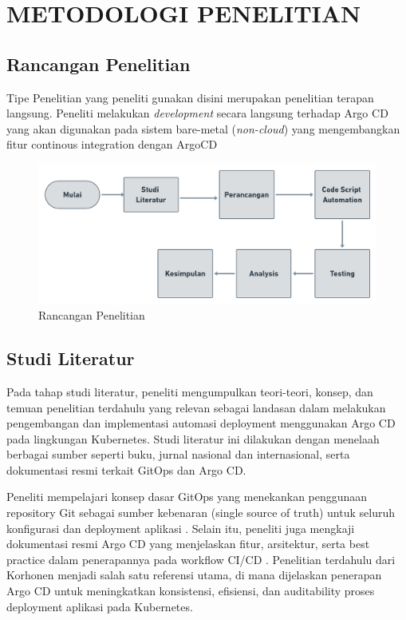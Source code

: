 \renewcommand{\chaptername}{BAB}
\chapter{METODOLOGI PENELITIAN}
\vspace{4.5pt}
\setlength{\parskip}{0.5em}
\section{Rancangan Penelitian}\label{sec:rancangan_penelitian}
Tipe Penelitian yang peneliti gunakan disini merupakan penelitian terapan langsung. Peneliti melakukan
\textit{development} secara langsung terhadap Argo CD yang akan digunakan pada sistem bare-metal (\textit{non-cloud}) yang mengembangkan fitur continous integration dengan ArgoCD

\begin{figure}[h]
    \centering
    \includegraphics[width=1\textwidth]{figures/Tahapan Skripsi.png}
    \caption{Rancangan Penelitian}
\end{figure}

\section{Studi Literatur}\label{sec:studi_literatur}
Pada tahap studi literatur, peneliti mengumpulkan teori-teori,
konsep, dan temuan penelitian terdahulu yang relevan sebagai landasan dalam melakukan pengembangan dan implementasi automasi deployment menggunakan Argo CD pada lingkungan Kubernetes.
Studi literatur ini dilakukan dengan menelaah berbagai sumber seperti buku, jurnal nasional dan internasional, serta dokumentasi resmi terkait GitOps dan Argo CD.

Peneliti mempelajari konsep dasar GitOps yang menekankan penggunaan repository Git sebagai sumber kebenaran (single source of truth) untuk seluruh konfigurasi dan deployment aplikasi \cite{Weaveworks2017}.
Selain itu, peneliti juga mengkaji dokumentasi resmi Argo CD yang menjelaskan fitur, arsitektur, serta best practice dalam penerapannya pada workflow CI/CD \cite{ArgoCDDocs}.
Penelitian terdahulu dari Korhonen \cite{Korhonen2021} menjadi salah satu referensi utama, di mana dijelaskan penerapan Argo CD untuk meningkatkan konsistensi, efisiensi, dan auditability proses deployment aplikasi pada Kubernetes.

